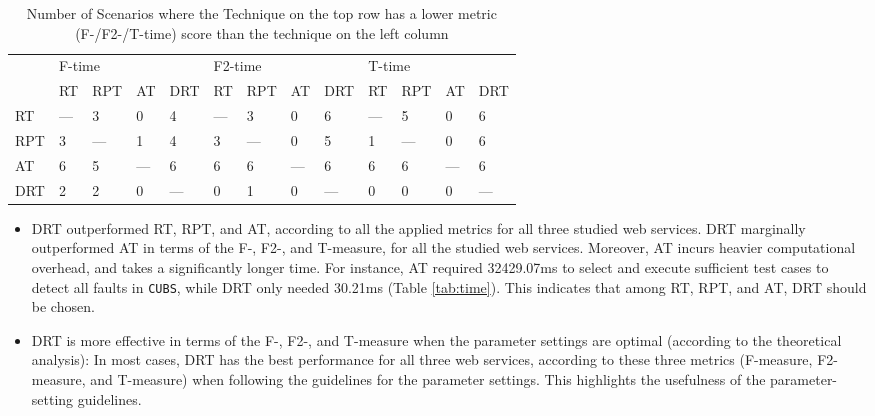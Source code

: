 \documentclass[10pt,journal,compsoc]{IEEEtran}
\begin{document}
\begin{table}
  \caption{Number of Scenarios where the Technique on the top row has a lower metric (F-/F2-/T-time) score than the technique on the left column}
  \centering
  \label{tableHlom:f/f2/t-time}
  \begin{tabular}{lllllllllllll}  \toprule
  \multirow{2}{*}{}&\multicolumn{4}{l}{F-time}&\multicolumn{4}{l}{F2-time}&\multicolumn{4}{l}{T-time}\\\cmidrule(lr){2-5}\cmidrule(lr){6-9}
  \cmidrule(lr){10-13}
     &\!RT\! &\!RPT\! &\!AT\!&\!DRT\!      &\!RT\!&\!RPT\!&\!AT\!&\!DRT\!              &\!RT\!&\!RPT\!&\!AT\!&\!DRT\!\\\midrule
  RT & ---   &3       &0     &4     &---   &3      &0   &6   &--- &5     &0     &6  \\
  RPT&3      & ---    &1     &4     &3     & ---   &0   &5   &1   &---   &0     &6 \\
  AT &6      &5       &---   &6     &6     &6      &--- &6   &6   &6     &---   &6    \\
  DRT&2      &2       &0     &---   &0     &1      &0   &--- &0   &0     &0     & ---  \\ \bottomrule
  \end{tabular}
\end{table}

\begin{itemize}
  \item
  DRT outperformed RT, RPT, and AT, according to all the applied metrics for all three studied web services. DRT marginally outperformed AT in terms of the F-, F2-, and T-measure, for all the studied web services. Moreover, AT incurs heavier computational overhead, and takes a significantly longer time. For instance, AT required 32429.07ms to select and execute sufficient test cases to detect all faults in \texttt{CUBS}, while DRT only needed 30.21ms (Table \ref{tab:time}). This indicates that among RT, RPT, and AT, DRT should be chosen.

  \item
  DRT is more effective in terms of the F-, F2-, and T-measure when the parameter settings are optimal (according to the theoretical analysis): In most cases, DRT has the best performance for all three web services, according to these three metrics (F-measure, F2-measure, and T-measure) when following the guidelines for the parameter settings. This highlights the usefulness of the parameter-setting guidelines.
\end{itemize}
\end{document}
